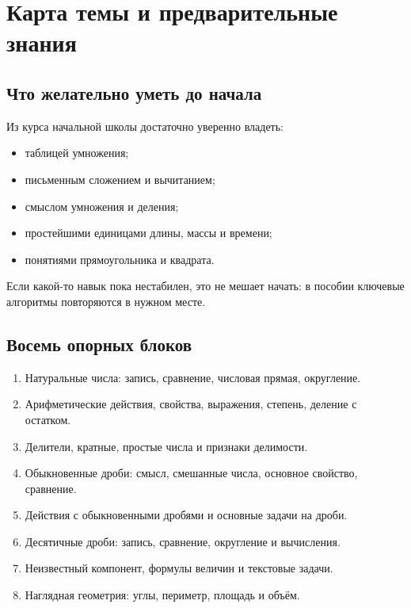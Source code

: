 \documentclass[12pt,a4paper]{article}
\begin{document}
\section{Карта темы и предварительные знания}

\subsection*{Что желательно уметь до начала}
Из курса начальной школы достаточно уверенно владеть:
\begin{itemize}
  \item таблицей умножения;
  \item письменным сложением и вычитанием;
  \item смыслом умножения и деления;
  \item простейшими единицами длины, массы и времени;
  \item понятиями прямоугольника и квадрата.
\end{itemize}

Если какой-то навык пока нестабилен, это не мешает начать: в пособии ключевые алгоритмы повторяются в нужном месте.

\subsection*{Восемь опорных блоков}
\begin{enumerate}
  \item Натуральные числа: запись, сравнение, числовая прямая, округление.
  \item Арифметические действия, свойства, выражения, степень, деление с остатком.
  \item Делители, кратные, простые числа и признаки делимости.
  \item Обыкновенные дроби: смысл, смешанные числа, основное свойство, сравнение.
  \item Действия с обыкновенными дробями и основные задачи на дроби.
  \item Десятичные дроби: запись, сравнение, округление и вычисления.
  \item Неизвестный компонент, формулы величин и текстовые задачи.
  \item Наглядная геометрия: углы, периметр, площадь и объём.
\end{enumerate}
\end{document}
